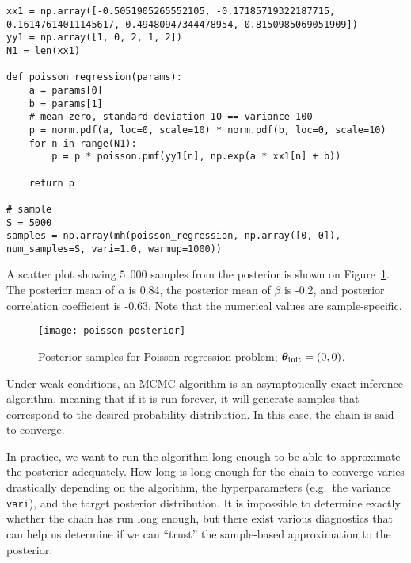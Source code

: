 \begin{exenumerate}
\begin{solution}
\begin{lstlisting}
xx1 = np.array([-0.5051905265552105, -0.17185719322187715, 0.16147614011145617, 0.49480947344478954, 0.8150985069051909])
yy1 = np.array([1, 0, 2, 1, 2])
N1 = len(xx1)

def poisson_regression(params):
    a = params[0]
    b = params[1]
    # mean zero, standard deviation 10 == variance 100
    p = norm.pdf(a, loc=0, scale=10) * norm.pdf(b, loc=0, scale=10) 
    for n in range(N1):
        p = p * poisson.pmf(yy1[n], np.exp(a * xx1[n] + b)) 

    return p

# sample
S = 5000
samples = np.array(mh(poisson_regression, np.array([0, 0]), num_samples=S, vari=1.0, warmup=1000))
\end{lstlisting}

A scatter plot showing $5,000$ samples from the posterior is shown on
Figure~\ref{fig:easy}. The posterior mean of $\alpha$ is 0.84, the
posterior mean of $\beta$ is -0.2, and posterior correlation
coefficient is -0.63. Note that the numerical values are sample-specific.
\begin{figure}
  \centering
  \texttt{[image: poisson-posterior]}
	\caption{Posterior samples for Poisson regression problem;
          $\boldsymbol{\theta}_{\mathrm{init}} = (0,0)$.}
	\label{fig:easy}
\end{figure}
      
    \end{solution}

    
\end{exenumerate}


\label{q:mh_mixing} Under weak conditions, an MCMC
algorithm is an asymptotically exact inference algorithm,
meaning that if it is run forever, it will generate samples that
correspond to the desired probability distribution. In this case, the
chain is said to converge.

In practice, we want to run the algorithm long enough to be able to
approximate the posterior adequately. How long is long enough for the
chain to converge varies drastically depending on the algorithm, the
hyperparameters (e.g.\ the variance \lstinline{vari}), and the target
posterior distribution. It is impossible to determine exactly whether
the chain has run long enough, but there exist various diagnostics
that can help us determine if we can ``trust'' the sample-based
approximation to the posterior.

